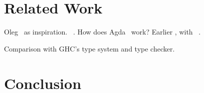 \section{Related Work}

Oleg~\cite{mcbride-thesis} as inspiration. \Epigram{}~\cite{view-left}.
How does Agda~\cite{norell-thesis} work?
Earlier \Idris{}, with \Ivor{}~\cite{ivor}.

Comparison with GHC's type system and type checker.

\section{Conclusion}
